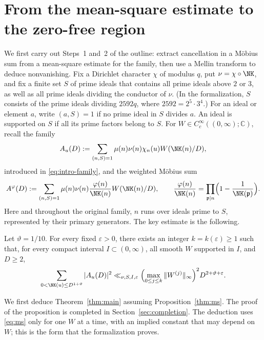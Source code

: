 \section{From the mean-square estimate to the zero-free region}\label{sec:reduction}

We first carry out Steps~1 and~2 of the outline: extract
cancellation in a M\"obius sum from a mean-square estimate for the family,
then use a Mellin transform to deduce nonvanishing.
Fix a Dirichlet character $\chi$ of modulus $q$, put $\nu=\chi\circ\NK$, and fix a finite set $S$
of prime ideals that contains all prime ideals above $2$ or $3$, as
well as all prime ideals dividing the conductor of $\nu$.
(In the formalization, $S$ consists of the prime ideals dividing $2592q$, where $2592=2^5\cdot3^4$.)
For an ideal or element $a$, write $(a,S)=1$ if no prime ideal in $S$
divides $a$.
An ideal is supported on $S$ if all its prime factors belong to $S$.
For $W\in C_c^\infty((0,\infty);\mathbb C)$, recall the family
\[
 A_u(D):=\sum_{(n,S)=1}\mu(n)\nu(n)\chi_n(u)W(\NK(n)/D),
\]
introduced in \eqref{eq:intro-family}, and the weighted M\"obius sum
\begin{equation}\label{eq:A-phi}
 A^\varphi(D):=\sum_{(n,S)=1}\mu(n)\nu(n)\frac{\varphi(n)}{\NK(n)}W(\NK(n)/D),
 \qquad
 \frac{\varphi(n)}{\NK(n)}=\prod_{\mathfrak p\mid n}\Bigl(1-\frac1{\NK(\mathfrak p)}\Bigr).
\end{equation}
Here and throughout the
original family, $n$ runs over ideals prime to $S$, represented by
their primary generators. The key estimate is the following.

\begin{proposition}\label{thm:ms}
Let $\vartheta=1/10$. For every fixed $\varepsilon>0$, there exists an integer $k=k(\varepsilon)\ge1$
such that, for every compact interval $I\subset(0,\infty)$,
all smooth $W$ supported in $I$, and $D\ge2$,
\begin{equation}\label{eq:ms}
 \sum_{0<\NK(u)\le D^{1+\vartheta}}|A_u(D)|^2
       \ll_{\nu,S,I,\varepsilon}
       \Bigl(\max_{0\le j\le k}\|W^{(j)}\|_\infty\Bigr)^2
       D^{2+\vartheta+\varepsilon}.
\end{equation}
\end{proposition}

We first deduce Theorem~\ref{thm:main} assuming Proposition~\ref{thm:ms}.
The proof of the proposition is completed in Section~\ref{sec:completion}.
The deduction uses \eqref{eq:ms} only for one $W$ at a time, with an implied constant that may
depend on $W$; this is the form that the formalization proves.

